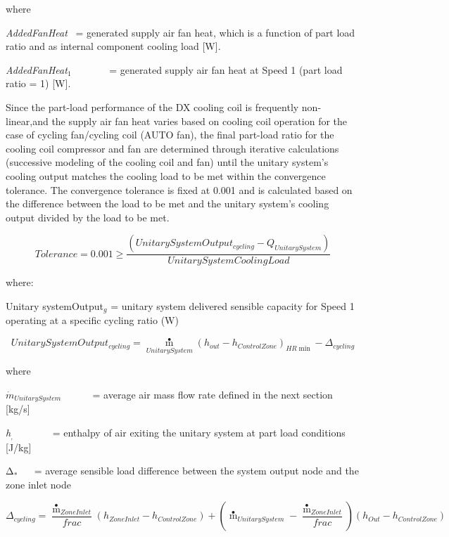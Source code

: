where

\emph{AddedFanHeat}~ = generated supply air fan heat, which is a function of part load ratio and as internal component cooling load {[}W{]}.

\emph{AddedFanHeat\(_{1}\)}~~~~~~~ = generated supply air fan heat at Speed 1 (part load ratio = 1) {[}W{]}.

Since the part-load performance of the DX cooling coil is frequently non-linear,and the supply air fan heat varies based on cooling coil operation for the case of cycling fan/cycling coil (AUTO fan), the final part-load ratio for the cooling coil compressor and fan are determined through iterative calculations (successive modeling of the cooling coil and fan) until the unitary system's cooling output matches the cooling load to be met within the convergence tolerance. The convergence tolerance is fixed at 0.001 and is calculated based on the difference between the load to be met and the unitary system's cooling output divided by the load to be met.

\begin{equation}
Tolerance = 0.001 \ge \frac{{\left( {UnitarySystemOutpu{t_{cycling}} - {Q_{UnitarySystem}}} \right)}}{{UnitarySystemCoolingLoad}}
\end{equation}

where:

Unitary systemOutput\(_{g}\) = unitary system delivered sensible capacity for Speed 1 operating at a specific cycling ratio (W)

\begin{equation}
UnitarySystemOutpu{t_{cycling}} = {\mathop m\limits^ \bullet_{UnitarySystem}}{\left( {{h_{out}} - {h_{ControlZone}}} \right)_{HR\min }} - {\Delta_{cycling}}
\end{equation}

where

\({\dot m{_{UnitarySystem}}}\) ~~~~~ = average air mass flow rate defined in the next section {[}kg/s{]}

\emph{h\(_{,}\)} ~~~~~ ~ = enthalpy of air exiting the unitary system at part load conditions {[}J/kg{]}

Δ\(_{*}\) ~~ = average sensible load difference between the system output node and the zone inlet node

\begin{equation}
{\Delta_{cycling}} = \frac{{{{\mathop m\limits^ \bullet  }_{ZoneInlet}}}}{{frac}}\left( {{h_{ZoneInlet}} - {h_{ControlZone}}} \right) + \left( {{{\mathop m\limits^ \bullet  }_{UnitarySystem}} - \frac{{{{\mathop m\limits^ \bullet  }_{ZoneInlet}}}}{{frac}}} \right)\left( {{h_{Out}} - {h_{ControlZone}}} \right)
\end{equation}

